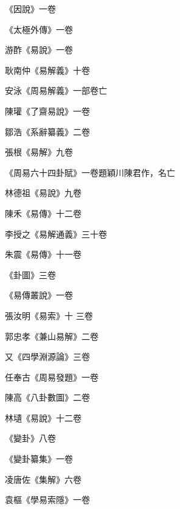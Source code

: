\begin{pinyinscope}
 《因說》一卷



 《太極外傳》一卷



 游酢《易說》一卷



 耿南仲《易解義》十卷



 安泳《周易解義》一部卷亡



 陳瓘《了齋易說》一卷



 鄒浩《系辭纂義》二卷



 張根《易解》九卷



 《周易六十四卦賦》一卷題穎川陳君作，名亡



 林德祖《易說》九卷



 陳禾《易傳》十二卷



 李授之《易解通義》三十卷



 朱震《易傳》十一卷



 《卦圖》三卷



 《易傳叢說》一卷



 張汝明《易索》十
 三卷



 郭忠孝《兼山易解》二卷



 又《四學淵源論》三卷



 任奉古《周易發題》一卷



 陳高《八卦數圖》二卷



 林壝《易說》十二卷



 《變卦》八卷



 《變卦纂集》一卷



 凌唐佐《集解》六卷



 袁樞《學易索隱》一卷




\end{pinyinscope}
